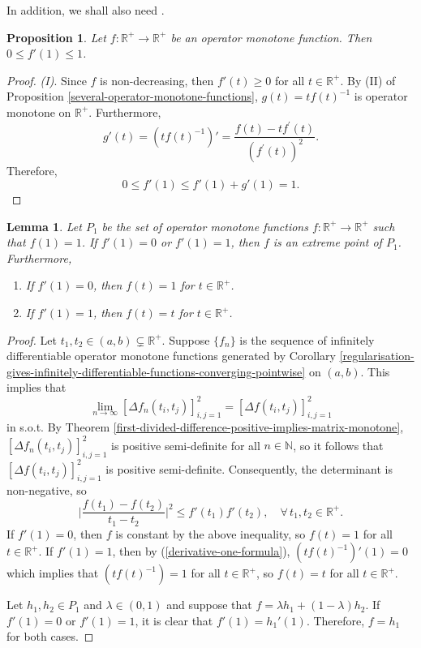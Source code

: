 \documentclass[12pt,a4paper]{amsart}
\newtheorem{lemma}[theorem]{Lemma}
\newtheorem{proposition}[theorem]{Proposition}
\theoremstyle{definition}
\begin{document}
	In addition, we shall also need \cite[Corollary 4.7]{hansen-fasttrack}. 
	\begin{proposition}
		Let $f: \mathbb{R}^{+} \rightarrow \mathbb{R}^{+}$ be an operator monotone function. Then $0 \leq f'(1) \leq 1$.
	\end{proposition}
	\begin{proof}
		\emph{\textnormal{(I)}}. Since $f$ is non-decreasing, then $f'(t) \geq 0$ for all $t \in \mathbb{R}^{+}$. By (II) of Proposition \ref{several-operator-monotone-functions}, $g(t) = tf(t)^{-1}$ is operator monotone on $\mathbb{R}^{+}$. Furthermore, 
		\[ g'(t) = (tf(t)^{-1})' = \frac{f(t)-tf^{'}(t)}{(f^{'}(t))^2}. \] 
		Therefore, 
		\begin{equation}\label{derivative-one-formula}
			0 \leq f'(1) \leq f'(1) + g'(1) = 1.
		\end{equation}
	\end{proof}
	
	\begin{lemma}\label{derivatie-one-or-zero-are-extreme-points}
		Let $P_1$ be the set of operator monotone functions $f: \mathbb{R}^{+} \rightarrow \mathbb{R}^{+}$ such that $f(1) = 1$. If $f'(1) = 0$ or $f'(1) = 1$, then $f$ is an extreme point of $P_1$. Furthermore, 
		\begin{enumerate}[label=\textnormal{(\Roman*)}]
			\item If $f'(1) = 0$, then $f(t) =1$ for $t \in \mathbb{R}^{+}$.
			\item If $f'(1) = 1$, then $f(t) =t$ for $t \in \mathbb{R}^{+}$.
		\end{enumerate}
	\end{lemma}
	\begin{proof}
		Let $t_1, t_2 \in (a, b) \subsetneq \mathbb{R}^{+}$. Suppose $\lbrace f_n \rbrace$ is the sequence of infinitely differentiable operator monotone functions generated by Corollary \ref{regularisation-gives-infinitely-differentiable-functions-converging-pointwise} on $(a, b)$. This implies that 
		\[  \lim_{n \rightarrow \infty}  [\Delta f_n(t_i, t_j)]_{i,j=1}^{2}  = [\Delta f(t_i, t_j)]_{i,j=1}^{2} \]
		in s.o.t.  By Theorem \ref{first-divided-difference-positive-implies-matrix-monotone}, $[\Delta f_n(t_i, t_j)]_{i,j=1}^{2} $  is positive semi-definite for all $n \in \mathbb{N}$, so it follows that $[\Delta f(t_i, t_j)]_{i,j=1}^{2} $ is positive semi-definite. Consequently, the determinant is non-negative, so
		\[ \bigg|   \frac{f(t_1) - f(t_2)}{t_1 - t_2} \bigg|^{2} \leq f'(t_1) f'(t_2), \quad \forall \, t_1, t_2 \in \mathbb{R}^{+}. \]
		If $f'(1) = 0$, then $f$ is constant by the above inequality, so $f(t) =1$ for all $t \in \mathbb{R}^{+}$. If $f'(1) = 1$, then by (\ref{derivative-one-formula}), $(tf(t)^{-1})'(1)=0$ which implies that $(tf(t)^{-1})=1$ for all  $t \in \mathbb{R}^{+}$, so  $f(t) = t$ for all  $t \in \mathbb{R}^{+}$.
		
		Let $h_1, h_2 \in P_1$ and $\lambda \in (0,1)$ and suppose that $f = \lambda h_1 + (1-\lambda) h_2$. If $f'(1) = 0$ or $f'(1) = 1$, it is clear that $f'(1) = h_1'(1)$. Therefore, $f=h_1$ for both cases.
	\end{proof}
	
\end{document}
